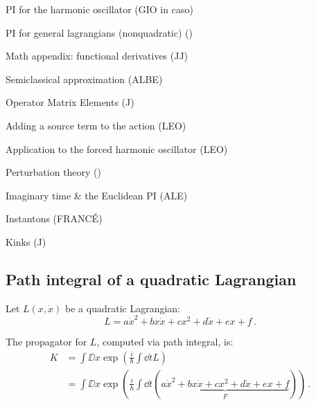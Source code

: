\documentclass[main.tex]{subfiles}
\begin{document}
PI for the harmonic oscillator (GIO in caso)

PI for general lagrangians (nonquadratic) ()

Math appendix: functional derivatives (JJ)

Semiclassical approximation (ALBE)

Operator Matrix Elements (J)

Adding a source term to the action (LEO)

Application to the forced harmonic oscillator (LEO)

Perturbation theory ()

Imaginary time \& the Euclidean PI (ALE)

Instantons (FRANCÉ)

Kinks (J)

\subsection{Path integral of a quadratic Lagrangian}

Let \(L(x,\dot{x})\) be a quadratic Lagrangian:
\begin{equation}
  L = a\dot{x}^2 + bx\dot{x} + cx^2 + d\dot{x} + ex + f
  \,.
\end{equation}

The propagator for $L$, computed via path integral, is:
%
\begin{subequations}
  \begin{align}
    K &= \int\DD{x} \exp(\frac{i}{\hbar}\int \dd{t} L) \\
    &= \int\DD{x} \exp(\frac{i}{\hbar}\int \dd{t} ( \underbrace{a\dot{x}^2 + bx\dot{x} + cx^2 + d\dot{x} + ex + f}_F) )
    \,.
  \end{align}
\end{subequations}
\end{document}

